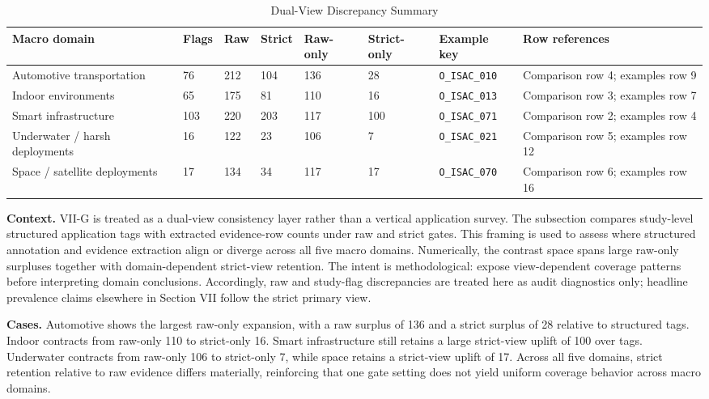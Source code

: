 \begin{table}[htbp]
\caption{Dual-View Discrepancy Summary}
\label{tab:section7_dualview}
\centering
\setlength{\tabcolsep}{4pt}
\renewcommand{\arraystretch}{1.08}
\begin{tabularx}{\textwidth}{L{2.45cm} C{1.1cm} C{1.1cm} C{1.1cm} C{1.25cm} C{1.3cm} L{1.8cm} Y}
\toprule
Macro domain & Flags & Raw & Strict & Raw-only & Strict-only & Example key & Row references \\
\midrule
Automotive transportation & 76 & 212 & 104 & 136 & 28 & \texttt{O\_ISAC\_010} & Comparison row 4; examples row 9 \\
Indoor environments & 65 & 175 & 81 & 110 & 16 & \texttt{O\_ISAC\_013} & Comparison row 3; examples row 7 \\
Smart infrastructure & 103 & 220 & 203 & 117 & 100 & \texttt{O\_ISAC\_071} & Comparison row 2; examples row 4 \\
Underwater / harsh deployments & 16 & 122 & 23 & 106 & 7 & \texttt{O\_ISAC\_021} & Comparison row 5; examples row 12 \\
Space / satellite deployments & 17 & 134 & 34 & 117 & 17 & \texttt{O\_ISAC\_070} & Comparison row 6; examples row 16 \\
\bottomrule
\end{tabularx}
\end{table}

\textbf{Context.} VII-G is treated as a dual-view consistency layer rather than a vertical application survey. The subsection compares study-level structured application tags with extracted evidence-row counts under raw and strict gates. This framing is used to assess where structured annotation and evidence extraction align or diverge across all five macro domains. Numerically, the contrast space spans large raw-only surpluses together with domain-dependent strict-view retention. The intent is methodological: expose view-dependent coverage patterns before interpreting domain conclusions. Accordingly, raw and study-flag discrepancies are treated here as audit diagnostics only; headline prevalence claims elsewhere in Section VII follow the strict primary view.

\textbf{Cases.} Automotive shows the largest raw-only expansion, with a raw surplus of 136 and a strict surplus of 28 relative to structured tags. Indoor contracts from raw-only 110 to strict-only 16. Smart infrastructure still retains a large strict-view uplift of 100 over tags. Underwater contracts from raw-only 106 to strict-only 7, while space retains a strict-view uplift of 17. Across all five domains, strict retention relative to raw evidence differs materially, reinforcing that one gate setting does not yield uniform coverage behavior across macro domains.


